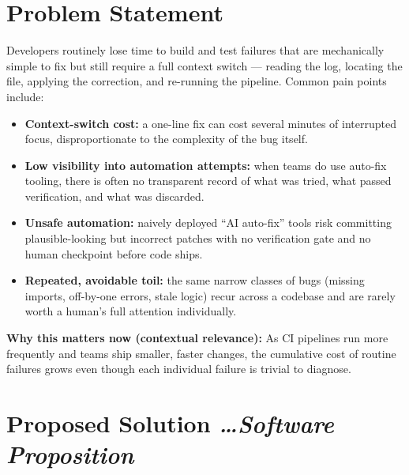 \documentclass[11pt,a4paper]{article}
\newcommand{\BvrHint}[1]{%
  {\normalfont\normalsize\itshape\hfill #1}}
\begin{document}
\section{Problem Statement}
Developers routinely lose time to build and test failures that are
mechanically simple to fix but still require a full context switch
--- reading the log, locating the file, applying the correction, and
re-running the pipeline. Common pain points include:
\begin{itemize}[leftmargin=0.7cm]
    \item \textbf{Context-switch cost:} a one-line fix can cost
      several minutes of interrupted focus, disproportionate to the
      complexity of the bug itself.
    \item \textbf{Low visibility into automation attempts:} when
      teams do use auto-fix tooling, there is often no transparent
      record of what was tried, what passed verification, and what
      was discarded.
    \item \textbf{Unsafe automation:} naively deployed ``AI
      auto-fix'' tools risk committing plausible-looking but incorrect
      patches with no verification gate and no human checkpoint
      before code ships.
    \item \textbf{Repeated, avoidable toil:} the same narrow classes
      of bugs (missing imports, off-by-one errors, stale logic)
      recur across a codebase and are rarely worth a human's full
      attention individually.
\end{itemize}

\textbf{Why this matters now (contextual relevance):} As CI
pipelines run more frequently and teams ship smaller, faster
changes, the cumulative cost of routine failures grows even though
each individual failure is trivial to diagnose.

\section{Proposed Solution %
\BvrHint{\ldots Software Proposition}}
\end{document}

